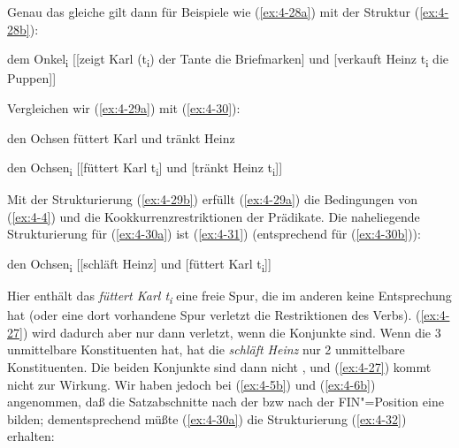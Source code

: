\documentclass[output=paper]{langsci/langscibook}
\begin{document}
Genau das gleiche gilt dann für Beispiele wie (\ref{ex:4-28a}) mit der Struktur (\ref{ex:4-28b}):

\begin{exe}
\ex
\label{ex:4-28}
\begin{xlist}

\ex%
\label{ex:4-28b}
dem Onkel\textsubscript{i} [[zeigt Karl (t\textsubscript{i}) der Tante die Briefmarken] und [verkauft Heinz t\textsubscript{i} die Puppen]]
\end{xlist}
\end{exe}
Vergleichen wir (\ref{ex:4-29a}) mit (\ref{ex:4-30}):

\begin{exe}
\ex
\label{ex:4-29}
\begin{xlist}
\ex%
\label{ex:4-29a}
den Ochsen füttert Karl und tränkt Heinz

\ex%
\label{ex:4-29b}
den Ochsen\textsubscript{i} [[füttert Karl t\textsubscript{i}] und [tränkt Heinz t\textsubscript{i}]]
\end{xlist}
\ex
\label{ex:4-30}
\begin{xlist}

\end{xlist}
\end{exe}
Mit der Strukturierung (\ref{ex:4-29b}) erfüllt (\ref{ex:4-29a}) die Bedingungen von (\ref{ex:4-4}) und die Kookkurrenzrestriktionen der Prädikate. Die naheliegende Strukturierung für (\ref{ex:4-30a}) ist (\ref{ex:4-31}) (entsprechend für (\ref{ex:4-30b})):


\begin{exe}
\ex%
\label{ex:4-31}
den Ochsen\textsubscript{i} [[schläft Heinz] und [füttert Karl t\textsubscript{i}]]
\end{exe}
Hier enthält das  \textit{füttert Karl t\textsubscript{i}} eine freie Spur, die im anderen  keine Entsprechung hat (oder eine dort vorhandene Spur verletzt die Restriktionen des Verbs). (\ref{ex:4-27}) wird dadurch aber nur dann verletzt, wenn die Konjunkte  sind. Wenn die  3 unmittelbare Konstituenten hat, hat die  \textit{schläft Heinz} nur 2 unmittelbare Konstituenten. Die beiden Konjunkte sind dann nicht , und (\ref{ex:4-27}) kommt nicht zur Wirkung. Wir haben jedoch bei (\ref{ex:4-5b}) und (\ref{ex:4-6b}) angenommen, daß die Satzabschnitte nach der  bzw nach der FIN"=Position eine  bilden; dementsprechend müßte (\ref{ex:4-30a}) die Strukturierung (\ref{ex:4-32}) erhalten:
\end{document}
